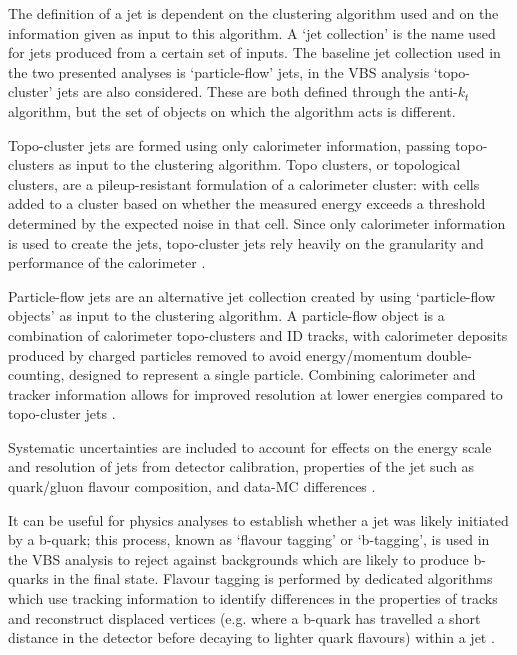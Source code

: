 The definition of a jet is dependent on the clustering algorithm used and on the
information given as input to this algorithm.
A `jet collection' is the name
used for jets produced from a certain set of inputs. The baseline jet collection
used in the two presented analyses is `particle-flow' jets, in the \ac{VBS}
analysis `topo-cluster' jets are also considered. These are both defined through
the anti-$k_t$ algorithm, but the set of objects on which the algorithm acts is
different.

Topo-cluster jets are formed using only calorimeter information, passing
topo-clusters as input to the clustering algorithm. Topo clusters, or
topological clusters, are a pileup-resistant formulation of a calorimeter
cluster: with cells added to a cluster based on whether the measured energy
exceeds a threshold determined by the expected noise in that cell. Since only
calorimeter information is used to create the jets, topo-cluster jets rely
heavily on the granularity and performance of the calorimeter \cite{Aad2017b}.

Particle-flow jets are an alternative jet collection created by using
`particle-flow objects' as input to the clustering algorithm. A particle-flow
object is a combination of calorimeter topo-clusters and \ac{ID} tracks, with
calorimeter deposits produced by charged particles removed to avoid
energy/momentum double-counting, designed to represent a single particle.
Combining calorimeter and tracker information allows for improved resolution at
lower energies compared to topo-cluster jets \cite{Aaboud2017a}.

Systematic uncertainties are included to account for effects on the energy scale
and resolution of jets from detector calibration, properties of the jet such as
quark/gluon flavour composition, and data-\ac{MC} differences
\cite{JESUncerts2017}.

It can be useful for physics analyses to establish whether a jet was likely
initiated by a b-quark; this process, known as `flavour tagging' or `b-tagging', is used in the
\ac{VBS} \Zy analysis to reject against backgrounds which are likely to produce
b-quarks in the final state. Flavour tagging is performed by dedicated
algorithms which use tracking information to identify differences in the
properties of tracks and reconstruct displaced vertices (e.g. where
a b-quark has travelled a short distance in the detector before decaying to
lighter quark flavours) within a jet \cite{ATLASbtag2019}.

